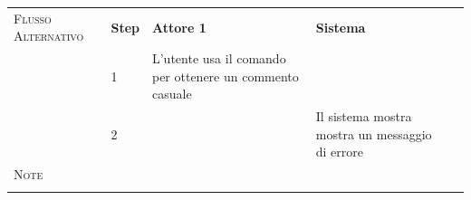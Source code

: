 \begin{table}[hp]
\begin{tabularx}{\textwidth}{llXXl}
        \textsc{Flusso Alternativo} & \textbf{Step} & \textbf{Attore 1}        & \textbf{Sistema} \\ \cline{2-5}
                               & 1             & L'utente usa il comando per ottenere un commento casuale       & \\ \cline{2-5}
                               & 2             &                          & Il sistema mostra mostra un messaggio di errore \\ \midrule
        \textsc{Note}         & \mcl{} \\
                               &         &                    &               &  \\
        \bottomrule
    \end{tabularx}
\end{table}



